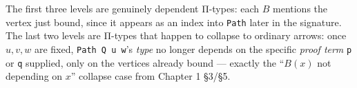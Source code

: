 The first three levels are genuinely dependent Π-types: each \(B\) mentions the vertex just bound, since it appears as an index into \texttt{Path} later in the signature. The last two levels are Π-types that happen to collapse to ordinary arrows: once \(u, v, w\) are fixed, \texttt{Path Q u w}'s \emph{type} no longer depends on the specific \emph{proof term} \texttt{p} or \texttt{q} supplied, only on the vertices already bound --- exactly the ``\(B(x)\) not depending on \(x\)'' collapse case from Chapter 1 §3/§5.
